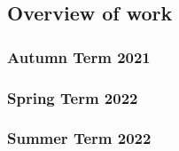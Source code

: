 \subsection{Overview of work}

\subsubsection{Autumn Term 2021}

\subsubsection{Spring Term 2022}

\subsubsection{Summer Term 2022}


\begin{comment}
    \subsection{Report structure}
    This section briefly introduces the structure of the main body of the report. The aim is to explain what will be covered in each chapter and how
these chapters relate to each other. The list is detailed below:
\begin{itemize}
    \item \textbf{Background Information}. This chapter will first illustrate the 
    literature review conducted and highlight what is the most feasible method for BP 
    estimation. As a result of this review, the necessary background information will be 
    discussed. The main background topics discussed will be medical background and machine 
    learning principles.
    \item \textbf{Analysis and Design}. This chapter will discuss the methodology used to
    \item  \textbf{Implementation}. This chapter will describe what work has been done in regards to the chosen method for estimating blood pressure. In addition, a mathematical overview of the chosen implementation will be discussed in detail. Finally, the justification for using Python as the sole programming language for this project will be given.
    \item \textbf{Testing Plan}. This chapter will describe the testing plan for the project.
    \item \textbf{Overview of Results}. This chapter will discuss the results of the implementation.
    \item \textbf{Evaluation of Results}. This chapter will discuss the evaluation of the results.
    \item \textbf{Evaluation plan}. This chapter will detail how the project deliverables will be evaluated. In addition, the chapter will show the estimated timeline and possible extensions.
    \item \textbf{Conclusions and Further Work}. This chapter will discuss the conclusions of the project and provide a list of possible future work.
\end{itemize}
\end{comment}
